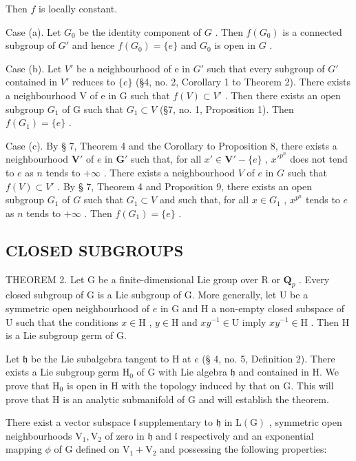 Then \(f\) is locally constant.

Case (a). Let \(G_0\) be the identity component of \(G\) . Then \(f(G_0)\) is a connected subgroup of \(G'\) and hence \(f(G_0) = \{e\}\) and \(G_0\) is open in \(G\) .

Case (b). Let \(V'\) be a neighbourhood of e in \(G'\) such that every subgroup of \(G'\) contained in \(V'\) reduces to \(\{e\}\) (§4, no. 2, Corollary 1 to Theorem 2). There exists a neighbourhood V of e in G such that \(f(V) \subset V'\) . Then there exists an open subgroup \(G_{1}\) of G such that \(G_{1} \subset V\) (§7, no. 1, Proposition 1). Then \(f(G_{1}) = \{e\}\) .

Case (c). By § 7, Theorem 4 and the Corollary to Proposition 8, there exists a neighbourhood \(\mathbf{V}'\) of \(e\) in \(\mathbf{G}'\) such that, for all \(x' \in \mathbf{V}' - \{e\}\) , \(x'^{p^n}\) does not tend to \(e\) as \(n\) tends to \(+\infty\) . There exists a neighbourhood \(V\) of \(e\) in \(G\) such that \(f(V) \subset V'\) . By § 7, Theorem 4 and Proposition 9, there exists an open subgroup \(G_1\) of \(G\) such that \(G_1 \subset V\) and such that, for all \(x \in G_1\) , \(x^{p^n}\) tends to \(e\) as \(n\) tends to \(+\infty\) . Then \(f(G_1) = \{e\}\) .

\subsection{CLOSED SUBGROUPS}

THEOREM 2. Let G be a finite-dimensional Lie group over R or \(\mathbf{Q}_{p}\) . Every closed subgroup of G is a Lie subgroup of G. More generally, let U be a symmetric open neighbourhood of \(e\) in G and H a non-empty closed subspace of U such that the conditions \(x \in \mathrm{H}\) , \(y \in \mathrm{H}\) and \(xy^{-1} \in \mathrm{U}\) imply \(xy^{-1} \in \mathrm{H}\) . Then H is a Lie subgroup germ of G.

Let \(\mathfrak{h}\) be the Lie subalgebra tangent to H at \(e\) (§ 4, no. 5, Definition 2). There exists a Lie subgroup germ \(\mathrm{H}_0\) of G with Lie algebra \(\mathfrak{h}\) and contained in H. We prove that \(\mathrm{H}_0\) is open in H with the topology induced by that on G. This will prove that H is an analytic submanifold of G and will establish the theorem.

There exist a vector subspace \(\mathfrak{l}\) supplementary to \(\mathfrak{h}\) in \(\mathrm{L}(\mathrm{G})\) , symmetric open neighbourhoods \(\mathrm{V}_1, \mathrm{V}_2\) of zero in \(\mathfrak{h}\) and \(\mathfrak{l}\) respectively and an exponential mapping \(\phi\) of \(\mathrm{G}\) defined on \(\mathrm{V}_1 + \mathrm{V}_2\) and possessing the following properties:

